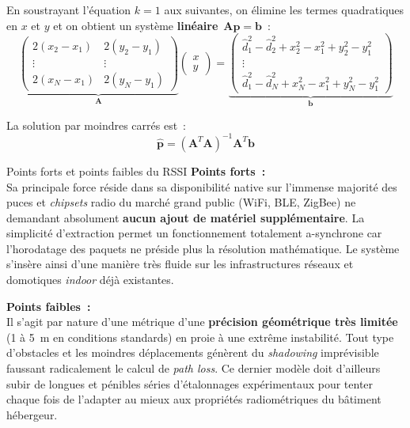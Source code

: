 \documentclass[12pt, a4paper]{article}
\begin{document}
En soustrayant l'équation $k=1$ aux suivantes, on élimine les termes quadratiques
en $x$ et $y$ et on obtient un système \textbf{linéaire}~$\mathbf{A}\mathbf{p} = \mathbf{b}$~:
\[
  \underbrace{
  \begin{pmatrix}
    2(x_2 - x_1) & 2(y_2 - y_1) \\
    \vdots & \vdots \\
    2(x_N - x_1) & 2(y_N - y_1)
  \end{pmatrix}
  }_{\mathbf{A}}
  \begin{pmatrix} x \\ y \end{pmatrix}
  =
  \underbrace{
  \begin{pmatrix}
    \hat{d}_1^2 - \hat{d}_2^2 + x_2^2 - x_1^2 + y_2^2 - y_1^2 \\
    \vdots \\
    \hat{d}_1^2 - \hat{d}_N^2 + x_N^2 - x_1^2 + y_N^2 - y_1^2
  \end{pmatrix}
  }_{\mathbf{b}}
\]

La solution par moindres carrés est~:
\begin{equation}
  \hat{\mathbf{p}} = (\mathbf{A}^T \mathbf{A})^{-1} \mathbf{A}^T \mathbf{b}
  \label{eq:moindres_carres}
\end{equation}

\begin{summarybox}{Points forts et points faibles du RSSI}
\textbf{Points forts~:}\\
Sa principale force réside dans sa disponibilité native sur l'immense majorité des puces et \textit{chipsets} radio du marché grand public (WiFi, BLE, ZigBee) ne demandant absolument \textbf{aucun ajout de matériel supplémentaire}. La simplicité d'extraction permet un fonctionnement totalement a-synchrone car l'horodatage des paquets ne préside plus la résolution mathématique. Le système s'insère ainsi d'une manière très fluide sur les infrastructures réseaux et domotiques \textit{indoor} déjà existantes.

\medskip
\textbf{Points faibles~:}\\
Il s'agit par nature d'une métrique d'une \textbf{précision géométrique très limitée} (1 à 5~m en conditions standards) en proie à une extrême instabilité. Tout type d'obstacles et les moindres déplacements génèrent du \textit{shadowing} imprévisible faussant radicalement le calcul de \textit{path loss}. Ce dernier modèle doit d'ailleurs subir de longues et pénibles séries d'étalonnages expérimentaux pour tenter chaque fois de l'adapter au mieux aux propriétés radiométriques du bâtiment hébergeur.
\end{summarybox}
\end{document}
